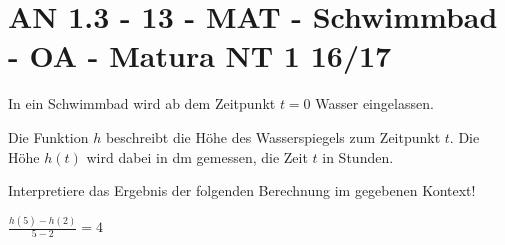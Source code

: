 \section{AN 1.3 - 13 - MAT - Schwimmbad - OA - Matura NT 1 16/17}

\begin{beispiel}[AN 1.3]{1} %
In ein Schwimmbad wird ab dem Zeitpunkt $t=0$ Wasser eingelassen.

Die Funktion $h$ beschreibt die Höhe des Wasserspiegels zum Zeitpunkt $t$. Die Höhe $h(t)$ wird dabei in dm gemessen, die Zeit $t$ in Stunden.

Interpretiere das Ergebnis der folgenden Berechnung im gegebenen Kontext!

$\frac{h(5)-h(2)}{5-2}=4$\leer

\end{beispiel}